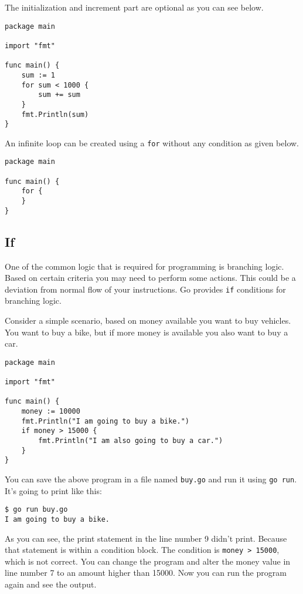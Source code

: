 The initialization and increment part are optional as you can see
below.

\begin{lstlisting}[caption=For loop (sum2.go)]
package main

import "fmt"

func main() {
    sum := 1
    for sum < 1000 {
        sum += sum
    }
    fmt.Println(sum)
}
\end{lstlisting}

An infinite loop can be created using a \texttt{for} without any
condition as given below.

\begin{lstlisting}[caption=For loop (sum2.go)]
package main

func main() {
    for {
    }
}
\end{lstlisting}

\subsection{If}

One of the common logic that is required for programming is branching
logic.  Based on certain criteria you may need to perform some
actions.  This could be a deviation from normal flow of your
instructions.  Go provides \texttt{if} conditions for
branching logic.

Consider a simple scenario, based on money available you want to buy
vehicles.  You want to buy a bike, but if more money is available you
also want to buy a car.

\begin{lstlisting}[caption=If control structure (buy.go)]
package main

import "fmt"

func main() {
    money := 10000
    fmt.Println("I am going to buy a bike.")
    if money > 15000 {
        fmt.Println("I am also going to buy a car.")
    }
}
\end{lstlisting}

You can save the above program in a file named \texttt{buy.go} and run
it using \texttt{go run}.  It's going to print like this:

\begin{lstlisting}[numbers=none]
$ go run buy.go
I am going to buy a bike.
\end{lstlisting}

As you can see, the print statement in the line number 9 didn't print.
Because that statement is within a condition block.  The condition is
\texttt{money > 15000}, which is not correct.  You can change the program and
alter the money value in line number 7 to an amount higher than 15000.
Now you can run the program again and see the output.

